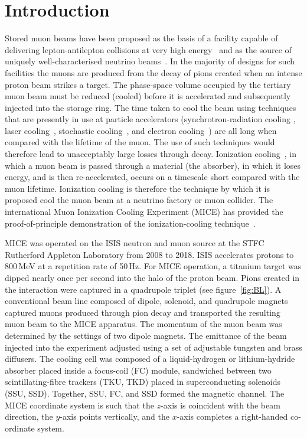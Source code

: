 \section{Introduction}
\label{Sect:Intro}

Stored muon beams have been proposed as the basis of a facility
capable of delivering lepton-antilepton collisions at very high
energy~\cite{Neuffer:1994bt,Palmer:2014nza} and as the source of
uniquely well-characterised neutrino 
beams~\cite{Geer:1998PhRvD..57.6989G,Bandyopadhyay:2007kx,Apollonio:2002en}.
In the majority of designs for such facilities the muons are produced
from the decay of pions created when an intense proton beam strikes a
target.
The phase-space volume occupied by the tertiary muon beam must be
reduced (cooled) before it is accelerated and subsequently injected
into the storage ring.
The time taken to cool the beam using techniques that are presently in
use at particle accelerators (synchrotron-radiation cooling
\cite{2012acph.book.....L}, laser
cooling~\cite{PhysRevLett.64.2901,PhysRevLett.67.1238,doi:10.1063/1.329218},
stochastic cooling~\cite{Marriner:2003mn}, and electron
cooling~\cite{1063-7869-43-5-R01}) are all long when compared with the
lifetime of the muon.
The use of such techniques would therefore lead to unacceptably large
losses through decay.
Ionization cooling~\cite{cooling_methods,Neuffer:1983jr}, in which a
muon beam is passed through a material (the absorber), in which it
loses energy, and is then re-accelerated, occurs on a timescale short
compared with the muon lifetime.
Ionization cooling is therefore the technique by which it is proposed
cool the muon beam at a neutrino factory or muon collider.
The international Muon Ionization Cooling Experiment (MICE) has
provided the proof-of-principle demonstration of the
ionization-cooling technique~\cite{Bogomilov:2019kfj}.

MICE was operated on the ISIS neutron and muon source at the STFC
Rutherford Appleton Laboratory from 2008 to 2018.  
ISIS accelerates protons to 800\,MeV at a repetition rate of
50\,Hz.
For MICE operation, a titanium target was dipped nearly once per
second into the halo of the proton beam. 
Pions created in the interaction were captured in a quadrupole triplet
(see figure~\ref{fig:BL}).
A conventional beam line composed of dipole, solenoid, and quadrupole
magnets captured muons produced through pion decay and transported the
resulting muon beam to the MICE apparatus.
The momentum of the muon beam was determined by the settings of two
dipole magnets.
The emittance of the beam injected into the experiment adjusted using
a set of adjustable tungsten and brass diffusers.
The cooling cell was composed of a liquid-hydrogen or lithium-hydride
absorber placed inside a focus-coil (FC) module, sandwiched between
two scintillating-fibre trackers (TKU, TKD) placed in superconducting
solenoids (SSU, SSD).
Together, SSU, FC, and SSD formed the magnetic channel.
The MICE coordinate system is such that the $z$-axis is coincident
with the beam direction, the $y$-axis points vertically, and the
$x$-axis completes a right-handed co-ordinate system.

